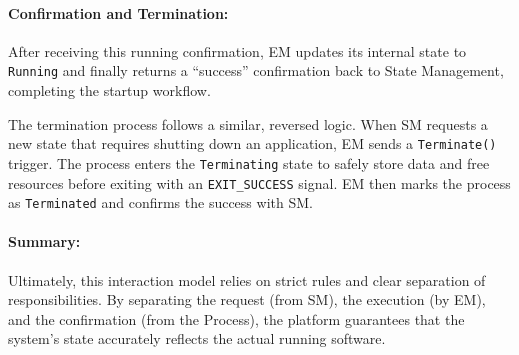 \paragraph*{Confirmation and Termination:}
After receiving this running confirmation, EM updates its internal state to \texttt{Running} and finally returns a ``success'' confirmation back to State Management, completing the startup workflow. 

The termination process follows a similar, reversed logic. When SM requests a new state that requires shutting down an application, EM sends a \texttt{Terminate()} trigger. The process enters the \texttt{Terminating} state to safely store data and free resources before exiting with an \texttt{EXIT\_SUCCESS} signal. EM then marks the process as \texttt{Terminated} and confirms the success with SM.

\paragraph*{Summary:}
Ultimately, this interaction model relies on strict rules and clear separation of responsibilities. By separating the request (from SM), the execution (by EM), and the confirmation (from the Process), the platform guarantees that the system's state accurately reflects the actual running software.





